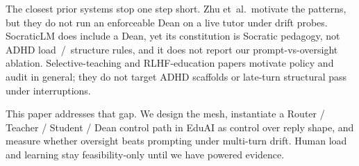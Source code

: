 The closest prior systems stop one step short. Zhu et~al.\ motivate the
patterns, but they do not run an enforceable Dean on a live tutor under drift
probes. SocraticLM does include a Dean, yet its constitution is Socratic
pedagogy, not ADHD load~/~structure rules, and it does not report our
prompt-vs-oversight ablation. Selective-teaching and RLHF-education papers
motivate policy and audit in general; they do not target ADHD scaffolds or
late-turn structural pass under interruptions.

This paper addresses that gap. We design the mesh, instantiate a
Router / Teacher / Student / Dean control path in EduAI as
control over reply shape, and measure whether oversight beats prompting under
multi-turn drift. Human load and learning stay feasibility-only until we have
powered evidence.
